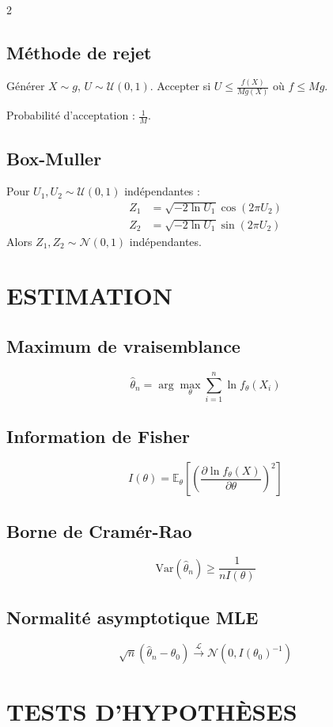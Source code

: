 \documentclass[10pt,a4paper]{article}
\begin{document}
\begin{multicols}{2}
\subsection*{Méthode de rejet}
Générer $X \sim g$, $U \sim \mathcal{U}(0,1)$.
Accepter si $U \leq \frac{f(X)}{M g(X)}$ où $f \leq M g$.

Probabilité d'acceptation : $\frac{1}{M}$.

\subsection*{Box-Muller}
Pour $U_1, U_2 \sim \mathcal{U}(0,1)$ indépendantes :
\begin{align*}
    Z_1 &= \sqrt{-2 \ln U_1} \cos(2\pi U_2) \\
    Z_2 &= \sqrt{-2 \ln U_1} \sin(2\pi U_2)
\end{align*}
Alors $Z_1, Z_2 \sim \mathcal{N}(0,1)$ indépendantes.

\section*{ESTIMATION}

\subsection*{Maximum de vraisemblance}
\[
\hat{\theta}_n = \arg\max_{\theta} \sum_{i=1}^n \ln f_\theta(X_i)
\]

\subsection*{Information de Fisher}
\[
I(\theta) = \mathbb{E}_\theta\left[\left(\frac{\partial \ln f_\theta(X)}{\partial \theta}\right)^2\right]
\]

\subsection*{Borne de Cramér-Rao}
\[
\text{Var}(\hat{\theta}_n) \geq \frac{1}{n I(\theta)}
\]

\subsection*{Normalité asymptotique MLE}
\[
\sqrt{n}(\hat{\theta}_n - \theta_0) \xrightarrow{\mathcal{L}} \mathcal{N}(0, I(\theta_0)^{-1})
\]

\section*{TESTS D'HYPOTHÈSES}


\end{multicols}
\end{document}
